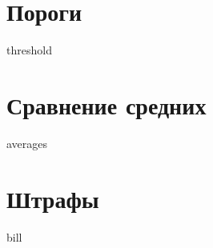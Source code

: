 
\section{Пороги}

{threshold}

\section[Средние]{Сравнение средних}

{averages}

\section{Штрафы}

{bill}

